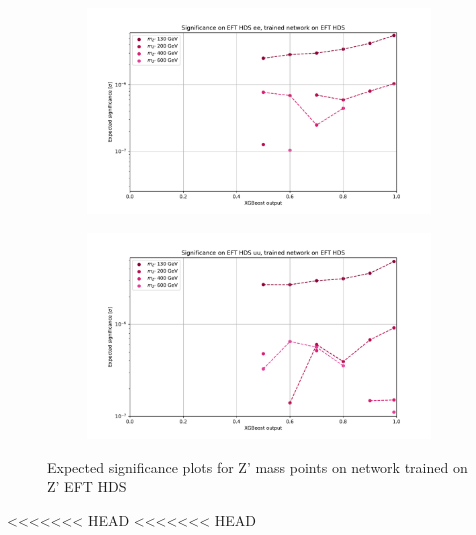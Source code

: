\documentclass[12pt, a4paper]{book}
\begin{document}
\begin{figure}[!ht]
	\centering
	\begin{subfigure}[b]{0.49\textwidth}
      \centering
      \includegraphics[width=1\textwidth]{XGBoost/EFT_HDS/EXP_SIG_ee.pdf}
      \end{subfigure}
   \hfill
   \begin{subfigure}[b]{0.49\textwidth}
      \centering
      \includegraphics[width=1\textwidth]{XGBoost/EFT_HDS/EXP_SIG_uu.pdf}
      \end{subfigure}
   \caption{Expected significance plots for Z' mass points on network trained on Z' EFT HDS}\label{fig:EFT_HDS_exp_sig}
\end{figure}
<<<<<<< HEAD
<<<<<<< HEAD
\end{document}
